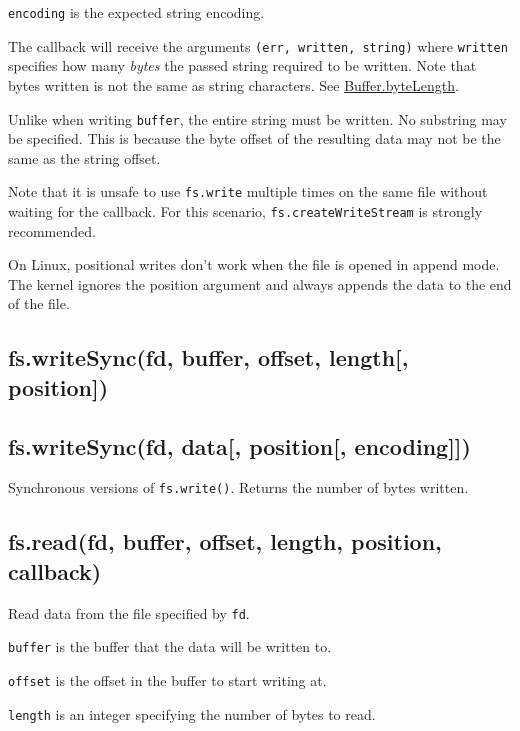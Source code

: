 \texttt{encoding} is the expected string encoding.

The callback will receive the arguments
\texttt{(err,\ written,\ string)} where \texttt{written} specifies how
many \emph{bytes} the passed string required to be written. Note that
bytes written is not the same as string characters. See
\href{buffer.html\#buffer_class_method_buffer_bytelength_string_encoding}{Buffer.byteLength}.

Unlike when writing \texttt{buffer}, the entire string must be written.
No substring may be specified. This is because the byte offset of the
resulting data may not be the same as the string offset.

Note that it is unsafe to use \texttt{fs.write} multiple times on the
same file without waiting for the callback. For this scenario,
\texttt{fs.createWriteStream} is strongly recommended.

On Linux, positional writes don't work when the file is opened in append
mode. The kernel ignores the position argument and always appends the
data to the end of the file.

\subsection{fs.writeSync(fd, buffer, offset, length{[},
position{]})}\label{fs.writesyncfd-buffer-offset-length-position}

\subsection{fs.writeSync(fd, data{[}, position{[},
encoding{]}{]})}\label{fs.writesyncfd-data-position-encoding}

Synchronous versions of \texttt{fs.write()}. Returns the number of bytes
written.

\subsection{fs.read(fd, buffer, offset, length, position,
callback)}\label{fs.readfd-buffer-offset-length-position-callback}

Read data from the file specified by \texttt{fd}.

\texttt{buffer} is the buffer that the data will be written to.

\texttt{offset} is the offset in the buffer to start writing at.

\texttt{length} is an integer specifying the number of bytes to read.

